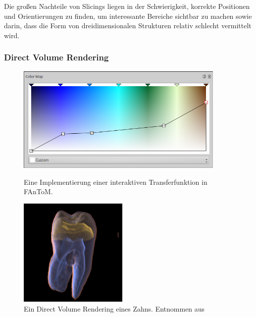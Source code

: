 \documentclass[a4paper,fontsize=12pt,toc=bib,halfparskip]{scrartcl}
\begin{document}
Die gro{\ss}en Nachteile von Slicings liegen in der Schwierigkeit, korrekte Positionen und Orientierungen zu finden, um interessante Bereiche sichtbar zu machen sowie darin, dass die Form von dreidimensionalen Strukturen relativ schlecht vermittelt wird. 

\subsubsection{Direct Volume Rendering}
\label{sec:DVR}
\begin{figure}
	\begin{minipage}{0.5\textwidth}
		\centering
		\includegraphics[width=0.9\textwidth]{pictures/Colormap.png}
		\caption{Eine Implementierung einer interaktiven Transferfunktion in FAnToM.} 
		\label{Colormap}
	\end{minipage}
	\hspace{0.5cm}
	\begin{minipage}{0.5\textwidth}
		\centering
		\includegraphics[width=0.47\textwidth]{pictures/Zahn.png}
		\caption{Ein Direct Volume Rendering eines Zahns. Entnommen aus \cite[S.~6]{drebin1988volume}}
		\label{Zahn}
	\end{minipage}
\end{figure}
\end{document}
